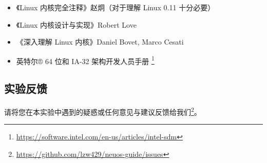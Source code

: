 \begin{itemize}
	\item 《Linux 内核完全注释》赵炯（对于理解 Linux 0.11 十分必要）
	\item 《Linux 内核设计与实现》Robert Love
	\item 《深入理解 Linux 内核》Daniel Bovet, Marco Cesati
	\item 英特尔® 64 位和 IA-32 架构开发人员手册 \footnote{\url{https://software.intel.com/en-us/articles/intel-sdm}} 
\end{itemize}

\subsection{实验反馈}        

请将您在本实验中遇到的疑惑或任何意见与建议反馈给我们\footnote{\url{https://github.com/lzw429/neuos-guide/issues}}。


